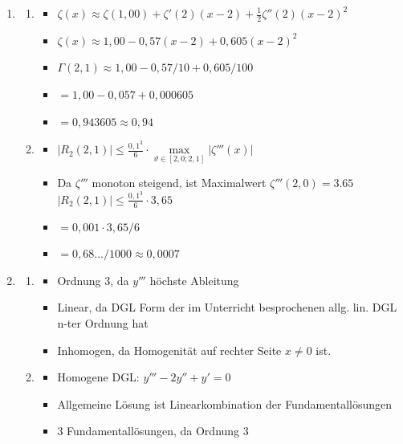 \documentclass[12pt]{article}
\begin{document}
{\begin{enumerate}
\begin{enumerate}
\end{enumerate}


\newpage


\item
\begin{enumerate}

\item
\begin{itemize}
\item $\zeta(x) \approx \zeta(1{,}{00}) + \zeta'(2)(x-2) + \frac{1}{2}\zeta''(2)(x-2)^2$
\item $\zeta(x) \approx 1{,00} - 0{,}57(x-2) + 0{,}605(x-2)^2$
\item $\Gamma(2{,}1) \approx 1{,}00 - 0{,}57 / 10 + 0{,}605 / 100$
\item $= 1{,}00 - 0{,}057 + 0{,}000605$
\item $= 0{,}943605 \approx 0{,}94$
\end{itemize}

\item
\begin{itemize}
\item $|R_2(2{,}1)| \le \frac{0{,}1^3}{6}\cdot\max\limits_{\vartheta \in [2{,}0;2{,}1]} |\zeta'''(x)|$
\item Da $\zeta'''$ monoton steigend, ist Maximalwert $\zeta'''(2{,0}) = 3.65$ \\
      $|R_2(2{,}1)| \le \frac{0{,}1^3}{6}\cdot 3{,}65$
\item $ = 0{,}001\cdot 3{,}65/6$
\item $ = 0{,}68.../1000 \approx 0{,}0007$
\end{itemize}

\end{enumerate}


\item 
\begin{enumerate}

\item 
\begin{itemize}
\item Ordnung 3, da $y'''$ höchste Ableitung
\item Linear, da DGL Form der im Unterricht besprochenen allg. lin. DGL n-ter Ordnung hat
\item Inhomogen, da Homogenität auf rechter Seite $x\ne 0$ ist.
\end{itemize}

\item 
\begin{itemize}
\item Homogene DGL: $y'''-2y''+y' = 0$
\item Allgemeine Lösung ist Linearkombination der Fundamentallösungen
\item 3 Fundamentallösungen, da Ordnung 3
\end{itemize}


\end{enumerate}
\end{enumerate}}
\end{document}

